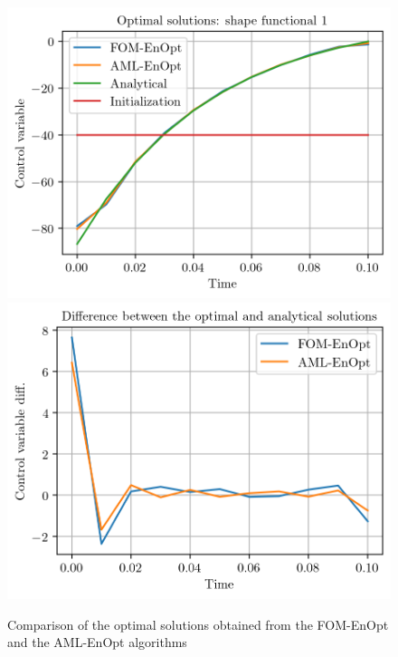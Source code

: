 
\begin{figure}
\centering
\includegraphics{Plots/solutions.png}
\includegraphics{Plots/solutionsDiffer.png}
\caption{\label{FOMAMLEnOptSolutionComp}Comparison of the optimal solutions obtained from the FOM-EnOpt and the AML-EnOpt algorithms}
\end{figure}

